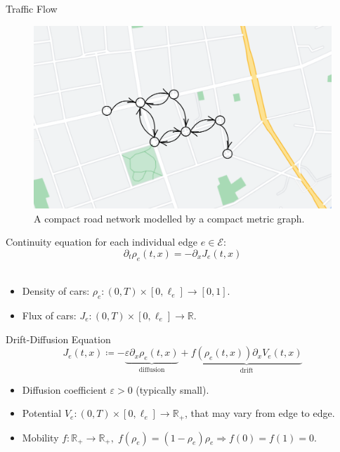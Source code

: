 \documentclass[9pt]{beamer}
\begin{document}
\begin{frame}{Traffic Flow}
    \begin{figure}[H]
        \begin{center}
            \includegraphics[scale=0.15]{img/diagram-20220316.png}
        \end{center}
        \caption{A compact road network modelled by a compact metric graph.}
    \end{figure}
    Continuity equation for each individual edge $e \in \mathcal{E}$:
    \begin{equation*}
        \partial_t \rho_e  \left( t,x \right)  = - \partial_x J_e \left( t,x \right)
    \end{equation*} \\
    \begin{itemize}
        \item Density of cars: $\rho_e \colon  \left( 0, T \right)  \times \left[ 0, \ell_e \right] \to \left[0, 1\right]$.
        \item Flux of cars: $J_e \colon  \left( 0,T \right)  \times \left[ 0, \ell_e \right] \to \mathbb{R}$.
    \end{itemize}
\end{frame}



\begin{frame}{Drift-Diffusion Equation}
    \begin{equation*} 
        J_e \left( t,x \right)  \coloneqq - \underbrace{\varepsilon \partial_x \rho_e  \left( t, x \right)}_{\text{diffusion}}  + \underbrace{f \left( \rho_e \left( t, x \right)  \right)  \partial_x V_e \left( t, x \right)}_{\text{drift}} 
    \end{equation*}
    \vspace{3mm}
    \begin{itemize}
        \item Diffusion coefficient $\varepsilon > 0$ (typically small).
        \item Potential $V_e \colon  \left( 0,T \right)  \times \left[ 0, \ell_e \right] \to \mathbb{R}_{+}$, that may vary from edge to edge.
        \item Mobility $f \colon \mathbb{R}_{+} \to \mathbb{R}_{+}, \; f \left( \rho_e \right)  =  \left( 1-\rho_e \right)  \rho_e \Rightarrow f \left( 0 \right)  = f \left( 1 \right)  = 0$. 
    \end{itemize}
\end{frame}
\end{document}
